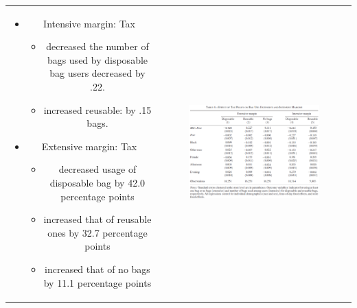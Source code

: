 \documentclass[dvipdfmx,11pt]{beamer}
\begin{document}
\begin{frame}\frametitle{}
  \begin{tabular}{cc}
    \begin{minipage}{.4\textwidth}
      \begin{itemize}
        \small
        \item Intensive margin: Tax
        \begin{itemize}
          \footnotesize
          \item decreased the number of bags used by disposable bag users decreased by .22.
          \item increased reusable: by .15 bags.
        \end{itemize}
        \item Extensive margin: Tax
        \begin{itemize}
          \footnotesize
          \item decreased usage of disposable bag by 42.0 percentage points
          \item increased that of reusable ones by 32.7 percentage points
          \item increased that of no bags by 11.1 percentage points
        \end{itemize}
      \end{itemize}
    \end{minipage} &
    \begin{minipage}{.6\textwidth}
      \begin{figure}[ht]
        \centering
        \includegraphics[scale = .43]{0807tanji/T4}
      \end{figure}
    \end{minipage}
  \end{tabular}
\end{frame}
\end{document}
